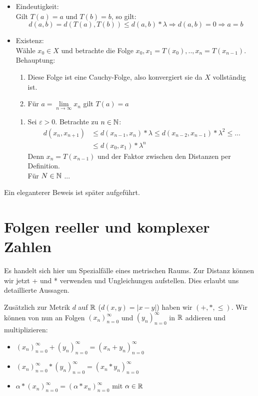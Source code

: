 \documentclass[main.tex]{subfiles}
\begin{document}
\begin{Beweis}
  \begin{itemize}
    \item Eindeutigkeit:\\
      Gilt $T(a) = a$ und $T(b) = b$, so gilt:
      $$d(a,b) = d(T(a),T(b)) \leq d(a,b) * \lambda \Rightarrow d(a,b) = 0 \Rightarrow a = b$$
    \item Existenz:\\
      Wähle $x_0 \in X$ und betrachte die Folge $x_0,x_1 = T(x_0),..,x_n =T(x_{n-1})$.\\
      Behauptung:
      \begin{enumerate}
        \item Diese Folge ist eine Cauchy-Folge, also konvergiert sie da $X$ vollständig ist.
        \item Für $a = \lim \limits_{n \to \infty} x_n$ gilt $T(a) = a$
      \end{enumerate}
      \begin{enumerate}
        \item Sei $\varepsilon > 0$. Betrachte zu $n \in \mathbb{N}$:
          $$\begin{aligned}
            d(x_n,x_{n+1}) &\leq d(x_{n-1},x_n)*\lambda \leq d(x_{n-2},x_{n-1})*\lambda^2 \leq ...\\
            &\leq d(x_0,x_1)*\lambda^n
          \end{aligned}$$
          Denn $x_n = T(x_{n-1})$ und der Faktor zwischen den Distanzen per Definition.\\
          Für $N \in \mathbb{N}$ ...
      \end{enumerate}
  \end{itemize}
  Ein eleganterer Beweis ist später aufgeführt.
\end{Beweis}



\section{Folgen reeller und komplexer Zahlen}
Es handelt sich hier um Spezialfälle eines metrischen Raums. Zur Distanz können wir jetzt + und * verwenden und Ungleichungen aufstellen. Dies erlaubt uns detaillierte Aussagen.

Zusätzlich zur Metrik $d$ auf $\mathbb{R}$ ($d(x,y) = |x-y|$) haben wir $(+,*,\leq)$. Wir können von nun an Folgen $(x_n)_{n=0}^\infty$ und $(y_n)_{n=0}^\infty$ in $\mathbb{R}$ addieren und multiplizieren:

\begin{Theorem}
  \begin{itemize}
    \item $(x_n)_{n=0}^\infty + (y_n)_{n=0}^\infty = (x_n + y_n)_{n=0}^\infty$
    \item $(x_n)_{n=0}^\infty * (y_n)_{n=0}^\infty = (x_n * y_n)_{n=0}^\infty$
    \item $\alpha * (x_n)_{n=0}^\infty = (\alpha * x_n)_{n=0}^\infty$ mit $\alpha \in \mathbb{R}$
  \end{itemize}
\end{Theorem}
\end{document}
